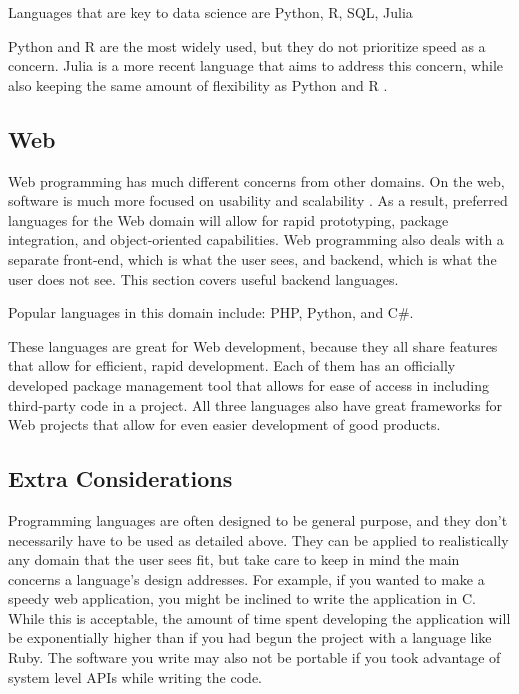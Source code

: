 \documentclass[12pt, oneside, a4paper]{book}
\begin{document}
         Languages that are key to data science are Python, R, SQL, Julia \autocite{MostPopularLanguages}

         Python and R are the most widely used, but they do not prioritize speed as a concern.
         Julia is a more recent language that aims to address this concern, while also keeping the same amount of flexibility as Python and R \autocite{MostPopularLanguages}.

         \subsection{Web}
         Web programming has much different concerns from other domains.
         On the web, software is much more focused on usability and scalability \autocite{siiaSoftwareServiceChanging2004}.
         As a result, preferred languages for the Web domain will allow for rapid prototyping, package integration, and object-oriented capabilities.
         Web programming also deals with a separate front-end, which is what the user sees, and backend, which is what the user does not see.
         This section covers useful backend languages.

         Popular languages in this domain include: PHP, Python, and C\#.

         These languages are great for Web development, because they all share features that allow for efficient, rapid development.
         Each of them has an officially developed package management tool that allows for ease of access in including third-party code in a project.
         All three languages also have great frameworks for Web projects that allow for even easier development of good products.
         \subsection{Extra Considerations}
         Programming languages are often designed to be general purpose, and they don't necessarily have to be used as detailed above.
         They can be applied to realistically any domain that the user sees fit, but take care to keep in mind the main concerns a language's design addresses.
         For example, if you wanted to make a speedy web application, you might be inclined to write the application in C.
         While this is acceptable, the amount of time spent developing the application will be exponentially higher than if you had begun the project with a language like Ruby.
         The software you write may also not be portable if you took advantage of system level APIs while writing the code.
         
\end{document}
